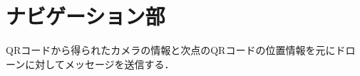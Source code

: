 \section{ナビゲーション部}
\label{implement_navigation}

QRコードから得られたカメラの情報と次点のQRコードの位置情報を元にドローンに対してメッセージを送信する．

